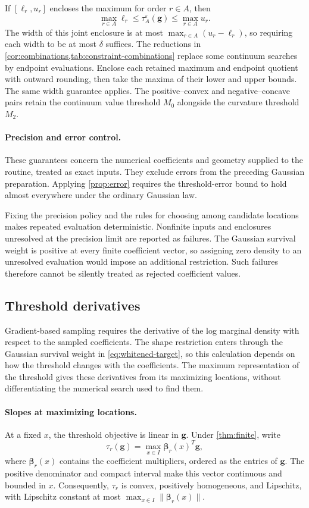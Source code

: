 If $[\ell_r,u_r]$ encloses the maximum for order $r\in A$, then
\[
 \max_{r\in A}\ell_r
 \leq\tau_A^\varepsilon(\boldsymbol g)
 \leq\max_{r\in A}u_r.
\]
The width of this joint enclosure is at most
$\max_{r\in A}(u_r-\ell_r)$, so requiring each width to be at most
$\delta$ suffices. The reductions in
\cref{cor:combinations,tab:constraint-combinations} replace some
continuum searches by endpoint evaluations. Enclose each retained
maximum and endpoint quotient with outward rounding, then take the
maxima of their lower and upper bounds. The same width guarantee
applies. The positive--convex and negative--concave pairs retain the
continuum value threshold $M_0$ alongside the curvature threshold
$M_2$.

\paragraph{Precision and error control.}
These guarantees concern the numerical coefficients and geometry
supplied to the routine, treated as exact inputs. They exclude errors
from the preceding Gaussian preparation. Applying \cref{prop:error}
requires the threshold-error bound to hold almost everywhere under
the ordinary Gaussian law.

Fixing the precision policy and the rules for choosing among
candidate locations makes repeated evaluation deterministic.
Nonfinite inputs and enclosures unresolved at the precision limit
are reported as failures. The Gaussian survival weight is positive
at every finite coefficient vector, so assigning zero density to an
unresolved evaluation would impose an additional restriction.
Such failures therefore cannot be silently treated as rejected
coefficient values.

\subsection{Threshold derivatives}
\label{subsec:threshold-derivatives}

Gradient-based sampling requires the derivative of the log marginal
density with respect to the sampled coefficients. The shape restriction
enters through the Gaussian survival weight in
\cref{eq:whitened-target}, so this calculation depends on how the
threshold changes with the coefficients. The maximum representation
of the threshold gives these derivatives from its maximizing locations,
without differentiating the numerical search used to find them.

\paragraph{Slopes at maximizing locations.}
At a fixed $x$, the threshold objective is linear in
$\boldsymbol g$. Under \cref{thm:finite}, write
\[
 \tau_r(\boldsymbol g)
 =\max_{x\in I}\boldsymbol\beta_r(x)^T\boldsymbol g,
\]
where $\boldsymbol\beta_r(x)$ contains the coefficient multipliers,
ordered as the entries of $\boldsymbol g$. The positive denominator
and compact interval make this vector continuous and bounded in $x$.
Consequently, $\tau_r$ is convex, positively homogeneous, and
Lipschitz, with Lipschitz constant at most
$\max_{x\in I}\|\boldsymbol\beta_r(x)\|$.

